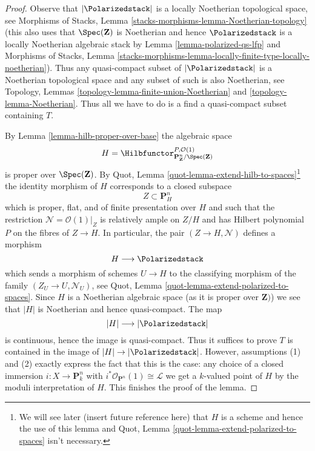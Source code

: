 \begin{proof}
Observe that $|\Polarizedstack|$ is a locally Noetherian topological
space, see Morphisms of Stacks, Lemma
\ref{stacks-morphisms-lemma-Noetherian-topology}
(this also uses that $\Spec(\mathbf{Z})$ is Noetherian and
hence $\Polarizedstack$ is a locally Noetherian algebraic stack
by Lemma \ref{lemma-polarized-qs-lfp} and
Morphisms of Stacks, Lemma
\ref{stacks-morphisms-lemma-locally-finite-type-locally-noetherian}).
Thus any quasi-compact subset of $|\Polarizedstack|$ is
a Noetherian topological space and any subset of such is
also Noetherian, see
Topology, Lemmas \ref{topology-lemma-finite-union-Noetherian} and
\ref{topology-lemma-Noetherian}.
Thus all we have to do is a find a quasi-compact subset
containing $T$.

\medskip\noindent
By Lemma \ref{lemma-hilb-proper-over-base} the algebraic space
$$
H =
\Hilbfunctor^{P, \mathcal{O}(1)}_{\mathbf{P}^n_\mathbf{Z}/\Spec(\mathbf{Z})}
$$
is proper over $\Spec(\mathbf{Z})$. By
Quot, Lemma \ref{quot-lemma-extend-hilb-to-spaces}\footnote{We will see
later (insert future reference here) that $H$ is a scheme and hence the
use of this lemma and Quot, Lemma \ref{quot-lemma-extend-polarized-to-spaces}
isn't necessary.} the identity morphism of $H$ corresponds
to a closed subspace
$$
Z \subset \mathbf{P}^n_H
$$
which is proper, flat, and of finite presentation over $H$ and
such that the restriction $\mathcal{N} = \mathcal{O}(1)|_Z$
is relatively ample on $Z/H$ and has Hilbert polynomial $P$
on the fibres of $Z \to H$. In particular, the pair $(Z \to H, \mathcal{N})$
defines a morphism
$$
H \longrightarrow \Polarizedstack
$$
which sends a morphism of schemes $U \to H$ to the classifying morphism
of the family $(Z_U \to U, \mathcal{N}_U)$, see
Quot, Lemma \ref{quot-lemma-extend-polarized-to-spaces}.
Since $H$ is a Noetherian algebraic space
(as it is proper over $\mathbf{Z})$)
we see that $|H|$ is Noetherian and hence quasi-compact. The map
$$
|H| \longrightarrow |\Polarizedstack|
$$
is continuous, hence the image is quasi-compact.
Thus it suffices to prove $T$ is contained
in the image of $|H| \to |\Polarizedstack|$.
However, assumptions (1) and (2) exactly express the fact
that this is the case: any choice of a closed immersion
$i : X \to \mathbf{P}^n_k$ with
$i^*\mathcal{O}_{\mathbf{P}^n}(1) \cong \mathcal{L}$ we get a
$k$-valued point of $H$ by the moduli interpretation of $H$.
This finishes the proof of the lemma.
\end{proof}






